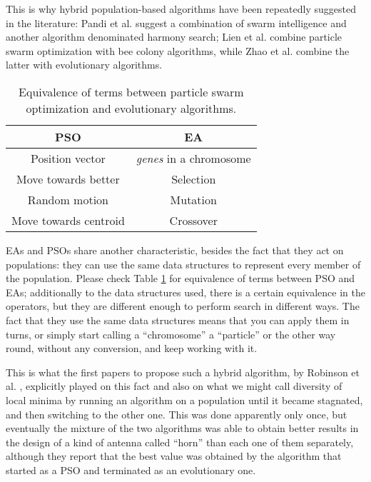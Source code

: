 This
is why hybrid population-based algorithms have been repeatedly
suggested in the literature: Pandi et al. \cite{pandi2011dynamic}
suggest a combination of swarm intelligence and another algorithm
denominated harmony search; Lien et al. \cite{lien2012hybrid} combine
particle swarm optimization with bee colony algorithms, while Zhao et
al. \cite{zhao2010hybrid} combine the latter with evolutionary
algorithms.

\begin{table}[h!tb]
    \caption{Equivalence of terms between particle swarm optimization
    and evolutionary algorithms. \label{tab:equivalence}}
\centering
\begin{tabular}{|c|c|}
  \hline
  PSO & EA \\ \hline
  Position vector & {\em genes} in a chromosome \\ \hline
  Move towards better & Selection  \\ \hline
  Random motion & Mutation \\ \hline
  Move towards centroid & Crossover \\ \hline
\end{tabular}
\end{table}
%
EAs and PSOs share another characteristic, besides the fact that they
act on populations: they can use the same data structures to
represent every member of the population. Please check Table
\ref{tab:equivalence} for equivalence of terms between PSO and EAs;
additionally to the data structures used, there is a certain
equivalence in the operators, but they are different enough to perform
search in different ways. The fact that they use the same data
structures means that you can apply them in turns, or simply start
calling a ``chromosome'' a ``particle'' or the other way round,
without any conversion, and keep working with it.

This is what the first papers to propose such a hybrid algorithm, by
Robinson et al. \cite{Robinson2002}, explicitly played on this
fact and also on what we might call diversity of local minima by
running an algorithm on a population until it became stagnated, and
then switching to the other one. This was done apparently only once,
but eventually the mixture of the two algorithms was able to obtain
better results in the design of a kind of antenna called ``horn'' than
each one of them separately, although they report that the best value
was obtained by the algorithm that started as a PSO and terminated as
an evolutionary one.

